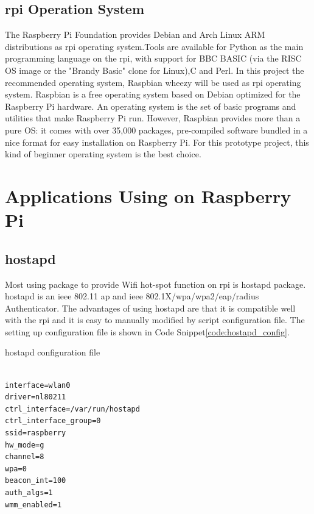 \subsection{\gls{rpi} Operation System}
\par The Raspberry Pi Foundation provides Debian and Arch Linux ARM distributions as \gls{rpi} operating system.Tools are available for Python as the main programming language on the \gls{rpi}, with support for BBC BASIC (via the RISC OS image or the "Brandy Basic" clone for Linux),C and Perl. In this project the recommended operating system, Raspbian wheezy\cite{raspbian} will be used as \gls{rpi} operating system. Raspbian is a free operating system based on Debian optimized for the Raspberry Pi hardware. An operating system is the set of basic programs and utilities that make Raspberry Pi run. However, Raspbian provides more than a pure OS: it comes with over 35,000 packages, pre-compiled software bundled in a nice format for easy installation on Raspberry Pi. For this prototype project, this kind of beginner operating system is the best choice.

\section{Applications Using on Raspberry Pi}

\subsection{hostapd}
\par Most using package to provide Wifi hot-spot function on \gls{rpi} is hostapd\cite{hostapd} package. hostapd is an \gls{ieee} 802.11 \gls{ap} and \gls{ieee} 802.1X/\gls{wpa}/\gls{wpa2}/\gls{eap}/\gls{radius} Authenticator. The  advantages of using hostapd are that it is compatible well with the \gls{rpi} and it is easy to manually modified by script configuration file. The setting up configuration file is shown in Code Snippet\ref{code:hostapd_config}.

\begin{algorithm}[h]
  \caption{hostapd configuration file}
  \label{code:hostapd_config}
  \begin{verbatim}
  
interface=wlan0
driver=nl80211
ctrl_interface=/var/run/hostapd
ctrl_interface_group=0
ssid=raspberry
hw_mode=g
channel=8
wpa=0
beacon_int=100
auth_algs=1
wmm_enabled=1
 \end{verbatim}
\end{algorithm}

